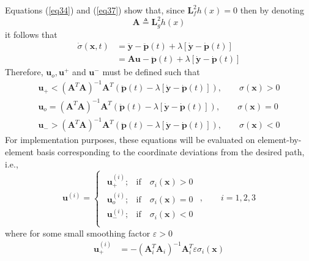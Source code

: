 \documentclass[twocolumn,10pt]{asme2e}
\begin{document}
{Equations (\ref{eq34}) and (\ref{eq37}) show that, since $\textbf{L}_f^2h(x)=0$ then by denoting
\begin{equation}\textbf{A}\triangleq\textbf{L}_{g}^2h(x)\end{equation} it follows that
\begin{align}\dot{\sigma}(\textbf{x},t)&=\ddot{\textbf{y}}-\ddot{\textbf{p}}(t)+\lambda\left[\dot{\textbf{y}}-\dot{\textbf{p}}(t)\right]\\
&=\textbf{A}\textbf{u}-\ddot{\textbf{p}}(t)+\lambda\left[\dot{\textbf{y}}-\dot{\textbf{p}}(t)\right]\end{align}
Therefore, $\textbf{u}_o, \textbf{u}^{+}$ and $\textbf{u}^{-}$ must be defined such that
\begin{align}
	\textbf{u}_{+}<\left(\textbf{A}^T\textbf{A}\right)^{-1}\textbf{A}^T\left(\ddot{\textbf{p}}(t)-\lambda\left[\dot{\textbf{y}}-\dot{\textbf{p}}(t)\right]\right), \qquad \sigma(\textbf{x})>0\\
	\textbf{u}_o=\left(\textbf{A}^T\textbf{A}\right)^{-1}\textbf{A}^T\left(\ddot{\textbf{p}}(t)-\lambda\left[\dot{\textbf{y}}-\dot{\textbf{p}}(t)\right]\right), \qquad \sigma(\textbf{x})=0\\
	\textbf{u}_{-}>\left(\textbf{A}^T\textbf{A}\right)^{-1}\textbf{A}^T\left(\ddot{\textbf{p}}(t)-\lambda\left[\dot{\textbf{y}}-\dot{\textbf{p}}(t)\right]\right),\qquad \sigma(\textbf{x})<0 \label{eq46}
\end{align}
For implementation purposes, these equations will be evaluated on element-by-element basis corresponding to the coordinate deviations from the desired path, i.e., \begin{equation}
	\textbf{u}^{(i)}=\begin{cases}
		\begin{array}{lr}
			\textbf{u}_{+}^{(i)}; &  \text{if}\quad \sigma_i(\textbf{x})>0\\  
			\textbf{u}_o^{(i)}; &  \text{if}\quad \sigma_i(\textbf{x})=0\\ 
			\textbf{u}_{-}^{(i)}; &  \text{if}\quad \sigma_i(\textbf{x})<0\\
		\end{array}
	\end{cases},\qquad i=1,2,3
\end{equation}
where for some small smoothing factor $\varepsilon>0$
\begin{align}
	\textbf{u}_{+}^{(i)}&=-\left(\textbf{A}_i^T\textbf{A}_i\right)^{-1}\textbf{A}_i^T\varepsilon\sigma_i(\textbf{x})\\

\end{align}}
\end{document}
